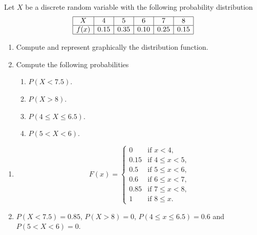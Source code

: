 
{Let $X$ be a discrete random variable with the following probability distribution
\[
\begin{array}{|c|c|c|c|c|c|}
\hline
X & 4 & 5 & 6 & 7 & 8 \\ 
\hline
f(x) & 0.15 & 0.35 & 0.10 & 0.25 & 0.15 \\ 
\hline
\end{array}
\]
\begin{enumerate}
\item  Compute and represent graphically the distribution function.
\item  Compute the following probabilities
\begin{enumerate}
\item  $P(X<7.5)$.
\item  $P(X>8)$.
\item  $P(4\leq X\leq 6.5)$.
\item  $P(5<X<6)$.
\end{enumerate}
\end{enumerate}
}
{
\begin{enumerate}
\item \[
F(x)=
\begin{cases}
0 & \text{if $x<4$,}\\
0.15 & \text{if $4\leq x<5$,}\\
0.5 & \text{if $5\leq x<6$,}\\
0.6 & \text{if $6\leq x<7$,}\\
0.85 & \text{if $7\leq x<8$,}\\
1 & \text{if $8\leq x$.}
\end{cases}
\]
\item $P(X<7.5)=0.85$, $P(X>8)=0$, $P(4\leq x\leq 6.5)=0.6$ and $P(5<X<6)=0$.
\end{enumerate}
}
{}


